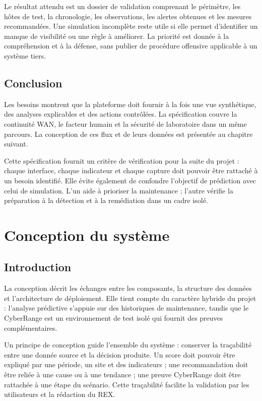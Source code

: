 \documentclass[12pt,a4paper,oneside]{report}
\begin{document}
Le résultat attendu est un dossier de validation comprenant le périmètre, les hôtes de test, la chronologie, les observations, les alertes obtenues et les mesures recommandées. Une simulation incomplète reste utile si elle permet d’identifier un manque de visibilité ou une règle à améliorer. La priorité est donnée à la compréhension et à la défense, sans publier de procédure offensive applicable à un système tiers.

\section{Conclusion}

Les besoins montrent que la plateforme doit fournir à la fois une vue synthétique, des analyses explicables et des actions contrôlées. La spécification couvre la continuité WAN, le facteur humain et la sécurité de laboratoire dans un même parcours. La conception de ces flux et de leurs données est présentée au chapitre suivant.

Cette spécification fournit un critère de vérification pour la suite du projet : chaque interface, chaque indicateur et chaque capture doit pouvoir être rattaché à un besoin identifié. Elle évite également de confondre l’objectif de prédiction avec celui de simulation. L’un aide à prioriser la maintenance ; l’autre vérifie la préparation à la détection et à la remédiation dans un cadre isolé.

\clearpage
\chapter{Conception du système}

\section{Introduction}

La conception décrit les échanges entre les composants, la structure des données et l’architecture de déploiement. Elle tient compte du caractère hybride du projet : l’analyse prédictive s’appuie sur des historiques de maintenance, tandis que le CyberRange est un environnement de test isolé qui fournit des preuves complémentaires.

Un principe de conception guide l’ensemble du système : conserver la traçabilité entre une donnée source et la décision produite. Un score doit pouvoir être expliqué par une période, un site et des indicateurs ; une recommandation doit être reliée à une cause ou à une tendance ; une preuve CyberRange doit être rattachée à une étape du scénario. Cette traçabilité facilite la validation par les utilisateurs et la rédaction du REX.
\end{document}
